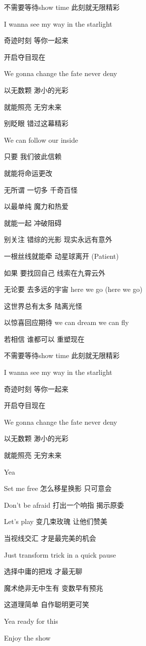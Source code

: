 \documentclass[]{ctexbook}
\begin{document}
不需要等待show time 此刻就无限精彩

I wanna see my way in the starlight

奇迹时刻 等你一起来

开启夺目现在

We gonna change the fate never deny

以无数颗 渺小的光彩

就能照亮 无穷未来

别眨眼 错过这幕精彩

We can follow our inside

只要 我们彼此信赖

就能将命运更改

无所谓 一切多 千奇百怪

以最单纯 魔力和热爱

就能一起 冲破阻碍

别关注 错综的光影 现实永远有意外

一根丝线就能牵 动星球离开 (Patient)

如果 要找回自己 线索在九霄云外

无论要 去多远的宇宙 here we go (here we go)

这世界总有太多 陆离光怪

以惊喜回应期待 we can dream we can fly

若相信 谁都可以 重塑现在

不需要等待show time 此刻就无限精彩

I wanna see my way in the starlight

奇迹时刻 等你一起来

开启夺目现在

We gonna change the fate never deny

以无数颗 渺小的光彩

就能照亮 无穷未来

Yea

Set me free 怎么移星换影 只可意会

Don't be afraid 打出一个响指 揭示原委

Let's play 变几束玫瑰 让他们赞美

当视线交汇 才是最完美的机会

Just transform trick in a quick pause

选择中庸的把戏 才最无聊

魔术绝非无中生有 变数早有预兆

这道理简单 自作聪明更可笑

Yea ready for this

Enjoy the show
\end{document}
